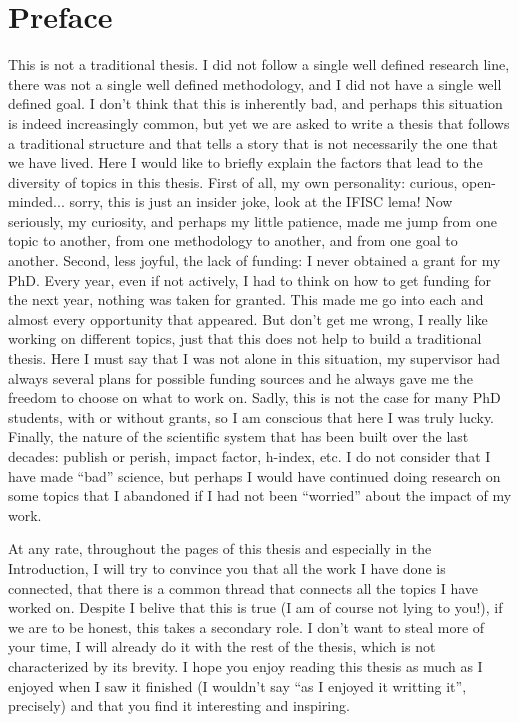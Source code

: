 \pagebreak
\thispagestyle{empty}
\section*{Preface}

This is not a traditional thesis. I did not follow a single well defined
research line, there was not a single well defined methodology, and I did not
have a single well defined goal. I don't think that this is inherently bad, and
perhaps this situation is indeed increasingly common, but yet we are asked to
write a thesis that follows a traditional structure and that tells a story that
is not necessarily the one that we have lived. Here I would like to briefly
explain the factors that lead to the diversity of topics in this thesis. First
of all, my own personality: curious, open-minded... sorry, this is just an
insider joke, look at the IFISC lema! Now seriously, my curiosity, and perhaps
my little patience, made me jump from one topic to another, from one
methodology to another, and from one goal to another. Second, less joyful,
the lack of funding: I never obtained a grant for my PhD. Every year, even if
not actively, I had to think on how to get funding for the next year, nothing
was taken for granted. This made me go into each and almost every opportunity
that appeared. But don't get me wrong, I really like working on different
topics, just that this does not help to build a traditional thesis. Here I must
say that I was not alone in this situation, my supervisor had always several
plans for possible funding sources and he always gave me the freedom to choose
on what to work on. Sadly, this is not the case for many PhD students, with or
without grants, so I am conscious that here I was truly lucky. Finally, the
nature of the scientific system that has been built over the last decades:
publish or perish, impact factor, h-index, etc. I do not consider that I
have made ``bad'' science, but perhaps I would have continued doing research on
some topics that I abandoned if I had not been ``worried'' about the impact of
my work.

At any rate, throughout the pages of this thesis and especially in the
Introduction, I will try to convince you that all the work I have done is
connected, that there is a common thread that connects all the topics I have
worked on. Despite I belive that this is true (I am of course not lying to
you!), if we are to be honest, this takes a secondary role. I don't want to
steal more of your time, I will already do it with the rest of the thesis,
which is not characterized by its brevity. I hope you enjoy reading this
thesis as much as I enjoyed when I saw it finished (I wouldn't say ``as I
enjoyed it writting it'', precisely) and that you find it interesting and
inspiring.


\vfill
